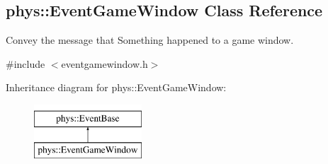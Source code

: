\hypertarget{classphys_1_1EventGameWindow}{
\subsection{phys::EventGameWindow Class Reference}
\label{d4/d0f/classphys_1_1EventGameWindow}
}


Convey the message that Something happened to a game window.  




{\ttfamily \#include $<$eventgamewindow.h$>$}

Inheritance diagram for phys::EventGameWindow:\begin{figure}[H]
\begin{center}
\leavevmode
\includegraphics[height=2.000000cm]{d4/d0f/classphys_1_1EventGameWindow}
\end{center}
\end{figure}
